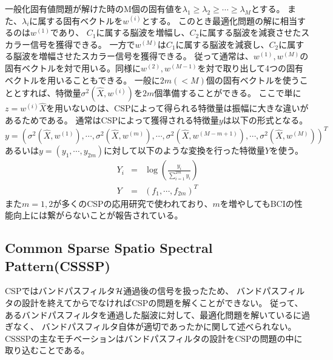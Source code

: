 一般化固有値問題が解けた時のM個の固有値を\(\lambda_1 \geq \lambda_2 \geq \cdots \geq \lambda_M\)とする。
また、\(\lambda_i\)に属する固有ベクトルを\(w^{(i)}\)とする。
このとき最適化問題の解に相当するのは\(w^{(1)}\)であり、
\(C_1\)に属する脳波を増幅し、\(C_2\)に属する脳波を減衰させたスカラー信号を獲得できる。
一方で\(w^{(M)}\)は\(C_1\)に属する脳波を減衰し、\(C_2\)に属する脳波を増幅させたスカラー信号を獲得できる。
従って通常は、\(w^{(1)},w^{(M)}\)の固有ベクトルを対で用いる。同様に\(w^{(2)},w^{(M-1)}\)を対で取り出して4つの固有ベクトルを用いることもできる。
一般に\(2m(<M)\)個の固有ベクトルを使うこととすれば、特徴量\(\sigma^2(\hat X,w^{(i)})\)を\(2m\)個準備することができる。
ここで単に\(z=w^{(i)}\hat X\)を用いないのは、CSPによって得られる特徴量は振幅に大きな違いがあるためである。
通常はCSPによって獲得される特徴量\(y\)は以下の形式となる。
\begin{equation}
    y = (\sigma^2(\hat X,w^{(1)}), \cdots, \sigma^2(\hat X,w^{(m)}), \cdots, \sigma^2(\hat X,w^{(M-m+1)}), \cdots, \sigma^2(\hat X,w^{(M)}))^T
\end{equation}
あるいは\(y=(y_1, \cdots, y_{2m})\)に対して以下のような変換を行った特徴量\(Y\)を使う。
\begin{eqnarray}
    Y_i &=& \log \left( \frac{y_i}{\sum_{i=1}^{2m}y_i} \right) \nonumber \\
    Y &=& (f_1, \cdots, f_{2m})^T 
\end{eqnarray}
また\(m=1,2\)が多くのCSPの応用研究で使われており、\(m\)を増やしてもBCIの性能向上には繋がらないことが報告されている\cite{cvscsp}。

  

\subsection{\rm Common Sparse Spatio Spectral Pattern(CSSSP)}
CSPではバンドパスフィルタ\(\cal H\)通過後の信号を扱ったため、
バンドパスフィルタの設計を終えてからでなければCSPの問題を解くことができない。
従って、あるバンドパスフィルタを通過した脳波に対して、最適化問題を解いているに過ぎなく、
バンドパスフィルタ自体が適切であったかに関して述べられない。
CSSSPの主なモチベーションはバンドパスフィルタの設計をCSPの問題の中に取り込むことである\cite{csssp}。

